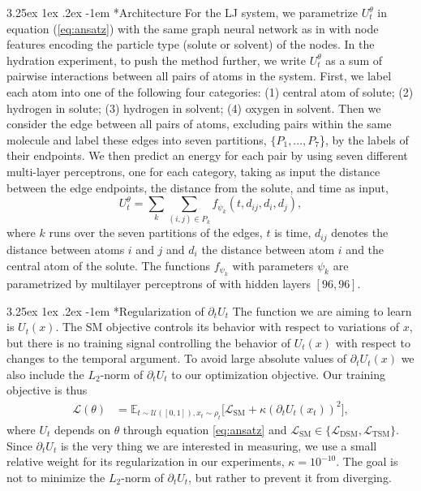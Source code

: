 \documentclass[%
onecolumn,
superscriptaddress,
nofootinbib,
amsmath,amssymb,
table
]{revtex4-2}
\makeatletter
\renewcommand\paragraph{%
  \@startsection{paragraph}{4}{\z@}%
    {3.25ex \@plus1ex \@minus.2ex}%
    {-1em}%
    {\normalfont\normalsize\bfseries}%
}
\makeatother
\begin{document}
\paragraph*{Architecture}
For the LJ system, we parametrize $U_t^\theta$ in equation (\ref{eq:ansatz}) with the same graph neural network as in \cite{mate2024neural} with node features encoding the particle type (solute or solvent) of the nodes. In the hydration experiment, to push the method further, we  write $U_t^\theta$ as a sum of pairwise interactions between all pairs of atoms in the system.
First, we  label each atom into one of the following four categories: (1) central atom of solute; (2) hydrogen in solute; (3) hydrogen in solvent; (4) oxygen in solvent. Then we consider the edge between all pairs of atoms, excluding pairs within the same molecule and label these edges into seven partitions, $\{P_1,...,P_7$\}, by the labels of their endpoints. We then predict an energy for each pair by using seven different multi-layer perceptrons, one for each category, taking as input the distance between the edge endpoints, the distance from the solute, and time as input,
\begin{equation}
    U_t^\theta = \sum_{k}\sum_{(i,j)\in P_k} f_{\psi_k}(t,d_{ij},d_i,d_j),
\end{equation}
where $k$ runs over the seven partitions of the edges, $t$ is time, $d_{ij}$ denotes the distance between atoms $i$ and $j$ and $d_i$ the distance between atom $i$ and the central atom of the solute. The functions $f_{\psi_k}$ with parameters $\psi_k$ are parametrized by multilayer perceptrons of with hidden layers $[96,96]$.

\paragraph*{Regularization of $\partial_t U_t$} The function we are aiming to learn is $U_t(x)$. The SM objective controls its behavior with respect to variations of $x$, but there is no training signal controlling the behavior of $U_t(x)$ with respect to changes to the temporal argument. To avoid large absolute values of $\partial_t U_t(x)$ we also include the $L_2$-norm of $\partial_t U_t$ to our optimization objective. Our training objective is thus
\begin{align}
    \label{eq:full_objective}
    \mathcal L(\theta) &= \mathbb E_{t\sim\mathcal U([0,1]),x_t\sim \rho_t}\Big[\mathcal L_{\mathrm{SM}}+ \kappa (\partial_t U_t(x_t))^2 \Big],
\end{align}
where $U_t$ depends on $\theta$ through equation \ref{eq:ansatz} and $ \mathcal L_{\mathrm{SM}} \in \{\mathcal L_{\mathrm{DSM}},\mathcal L_{\mathrm{TSM}}\}$.
Since $\partial_t U_t$ is the very thing we are interested in measuring, we use a small relative weight for its regularization in our experiments, $\kappa=10^{-10}$. The goal is not to minimize the $L_2$-norm of $\partial_t U_t$, but rather to prevent it from diverging.
\end{document}
